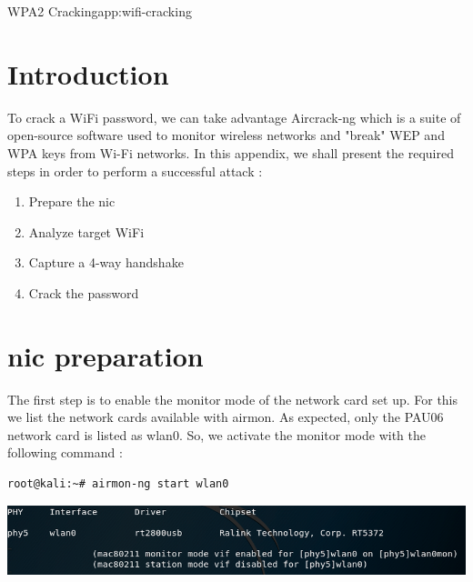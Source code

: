 \begin{appchaptercover}{WPA2 Cracking}{app:wifi-cracking}

\section{Introduction}

To crack a WiFi password, we can take advantage Aircrack-ng which is a suite of open-source software used to monitor wireless networks and "break" WEP and WPA keys from Wi-Fi networks. In this appendix, we shall present the required steps in order to perform a successful attack :
\begin{enumerate}
  \item Prepare the \acrshort{nic}
  \item Analyze target WiFi
  \item Capture a 4-way handshake
  \item Crack the password
\end{enumerate}


\section{\acrshort{nic} preparation}

The first step is to enable the monitor mode of the network card set up. For this we list the network cards available with airmon. As expected, only the PAU06 network card is listed as wlan0. So, we activate the monitor mode with the following command :

\begin{center}
\begin{minipage}{.75\linewidth}
\begin{lstlisting}
root@kali:~# airmon-ng start wlan0
\end{lstlisting}
\end{minipage}
\end{center}

\begin{center}
\includegraphics[width=\linewidth]{figures/wpa2-cracking-monitor-mode}
\end{center}


\end{appchaptercover}
